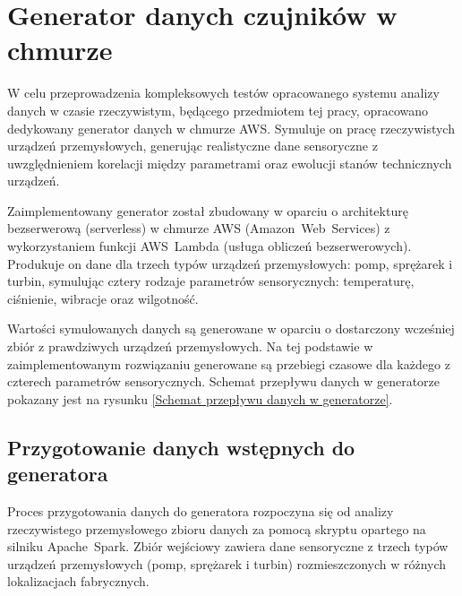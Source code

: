 \section{Generator danych czujników w chmurze}
\label{sec:implementacja_generowania}


W celu przeprowadzenia kompleksowych testów opracowanego systemu analizy danych w czasie rzeczywistym, będącego przedmiotem tej pracy, opracowano dedykowany generator danych w chmurze AWS. Symuluje on pracę rzeczywistych urządzeń przemysłowych, generując realistyczne dane sensoryczne z uwzględnieniem korelacji między parametrami oraz ewolucji stanów technicznych urządzeń.

Zaimplementowany generator został zbudowany w oparciu o architekturę bezserwerową (serverless) w chmurze AWS (\mbox{Amazon Web Services}) z wykorzystaniem funkcji \mbox{AWS Lambda} (usługa obliczeń bezserwerowych). Produkuje on dane dla trzech typów urządzeń przemysłowych: pomp, sprężarek i turbin, symulując cztery rodzaje parametrów sensorycznych: temperaturę, ciśnienie, wibracje oraz wilgotność.

Wartości symulowanych danych są generowane w oparciu o dostarczony wcześniej zbiór z prawdziwych urządzeń przemysłowych. Na tej podstawie w zaimplementowanym rozwiązaniu generowane są przebiegi czasowe dla każdego z czterech parametrów sensorycznych. Schemat przepływu danych w generatorze pokazany jest na rysunku \ref{Schemat przepływu danych w generatorze}.


\subsection{Przygotowanie danych wstępnych do generatora}

Proces przygotowania danych do generatora rozpoczyna się od analizy rzeczywistego przemysłowego zbioru danych za pomocą skryptu opartego na silniku \mbox{Apache Spark}. Zbiór wejściowy zawiera dane sensoryczne z trzech typów urządzeń przemysłowych (pomp, sprężarek i turbin) rozmieszczonych w różnych lokalizacjach fabrycznych.

